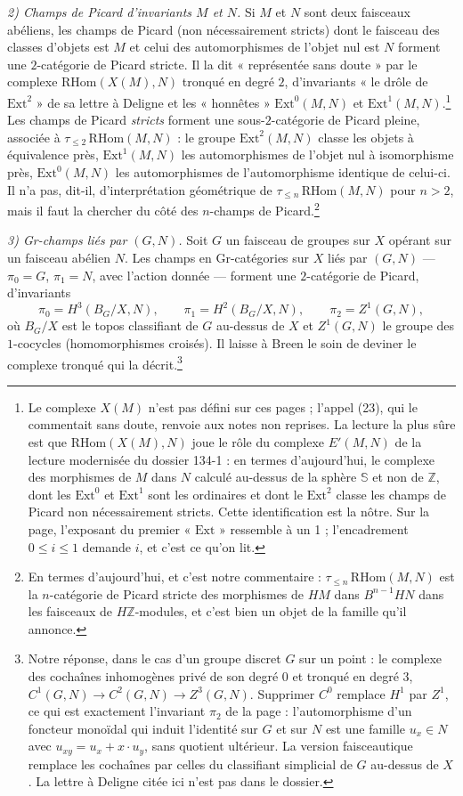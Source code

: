 \documentclass[11pt,a4paper]{article}
\begin{document}
\emph{2) Champs de Picard d'invariants $M$ et $N$.} Si $M$ et $N$ sont deux
faisceaux abéliens, les champs de Picard (non nécessairement stricts) dont
le faisceau des classes d'objets est $M$ et celui des automorphismes de
l'objet nul est $N$ forment une $2$-catégorie de Picard stricte. Il la dit
« représentée sans doute » par le complexe $\mathrm{RHom}(X(M),N)$ tronqué
en degré $2$, d'invariants « le drôle de $\mathrm{Ext}^2$ » de sa lettre à
Deligne et les « honnêtes » $\mathrm{Ext}^0(M,N)$ et
$\mathrm{Ext}^1(M,N)$.\footnote{Le complexe $X(M)$ n'est pas défini sur ces
pages ; l'appel (23), qui le commentait sans doute, renvoie aux notes non
reprises. La lecture la plus sûre est que $\mathrm{RHom}(X(M),N)$ joue le
rôle du complexe $E'(M,N)$ de la lecture modernisée du dossier 134-1 : en
termes d'aujourd'hui, le complexe des morphismes de $M$ dans $N$ calculé au-dessus de
la sphère $\mathbb{S}$ et non de $\mathbb{Z}$, dont les $\mathrm{Ext}^0$ et
$\mathrm{Ext}^1$ sont les ordinaires et dont le $\mathrm{Ext}^2$ classe les
champs de Picard non nécessairement stricts. Cette identification est la
nôtre. Sur la page, l'exposant du premier « $\mathrm{Ext}$ » ressemble à un
1 ; l'encadrement $0 \leqslant i \leqslant 1$ demande $i$, et c'est ce qu'on
lit.} Les champs de Picard \emph{stricts} forment une sous-$2$-catégorie de
Picard pleine, associée à $\tau_{\leqslant 2}\,\mathrm{RHom}(M,N)$ : le
groupe $\mathrm{Ext}^2(M,N)$ classe les objets à équivalence près,
$\mathrm{Ext}^1(M,N)$ les automorphismes de l'objet nul à isomorphisme près,
$\mathrm{Ext}^0(M,N)$ les automorphismes de l'automorphisme identique de
celui-ci. Il n'a pas, dit-il, d'interprétation géométrique de
$\tau_{\leqslant n}\,\mathrm{RHom}(M,N)$ pour $n > 2$, mais il faut la
chercher du côté des $n$-champs de Picard.\footnote{En termes
d'aujourd'hui, et c'est notre commentaire : $\tau_{\leqslant n}\,
\mathrm{RHom}(M,N)$ est la $n$-catégorie de Picard stricte des morphismes
de $HM$ dans $B^{n-1}HN$ dans les faisceaux de $H\mathbb{Z}$-modules, et
c'est bien un objet de la famille qu'il annonce.}

\emph{3) Gr-champs liés par $(G,N)$.} Soit $G$ un faisceau de groupes sur
$X$ opérant sur un faisceau abélien $N$. Les champs en Gr-catégories sur
$X$ liés par $(G,N)$ --- $\pi_0 = G$, $\pi_1 = N$, avec l'action donnée ---
forment une $2$-catégorie de Picard, d'invariants
\[
\pi_0 = H^3(B_G/X, N), \qquad \pi_1 = H^2(B_G/X, N), \qquad \pi_2 = Z^1(G,N),
\]
où $B_G/X$ est le topos classifiant de $G$ au-dessus de $X$ et $Z^1(G,N)$
le groupe des $1$-cocycles (homomorphismes croisés). Il laisse à Breen le
soin de deviner le complexe tronqué qui la décrit.\footnote{Notre réponse,
dans le cas d'un groupe discret $G$ sur un point : le complexe des cochaînes
inhomogènes privé de son degré $0$ et tronqué en degré $3$,
$C^1(G,N) \to C^2(G,N) \to Z^3(G,N)$. Supprimer $C^0$ remplace $H^1$ par
$Z^1$, ce qui est exactement l'invariant $\pi_2$ de la page :
l'automorphisme d'un foncteur monoïdal qui induit l'identité sur $G$ et sur
$N$ est une famille $u_x \in N$ avec $u_{xy} = u_x + x\cdot u_y$, sans
quotient ultérieur. La version faisceautique remplace les cochaînes par
celles du classifiant simplicial de $G$ au-dessus de $X$. La lettre à
Deligne citée ici n'est pas dans le dossier.}
\end{document}
